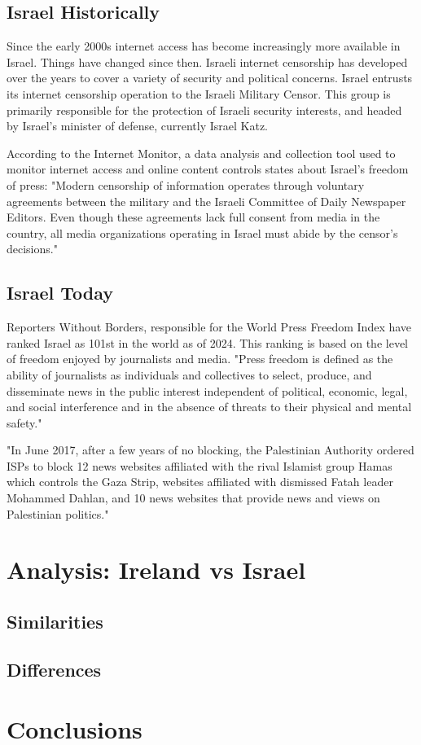 \subsection{Israel Historically}
Since the early 2000s internet access has become increasingly more available in Israel. Things have changed since then. Israeli internet censorship has developed over the years to cover a variety of security and political concerns. Israel entrusts its internet censorship operation to the Israeli Military Censor. This group is primarily responsible for the protection of Israeli security interests, and headed by Israel's minister of defense, currently Israel Katz. 

According to the Internet Monitor, a data analysis and collection tool used to monitor internet access and online content controls states about Israel's freedom of press: "Modern censorship of information operates through voluntary agreements between the military and the Israeli Committee of Daily Newspaper Editors. Even though these agreements lack full consent from media in the country, all media organizations operating in Israel must abide by the censor's decisions." \cite{internet_monitor_israel}



\subsection{Israel Today}
Reporters Without Borders, responsible for the World Press Freedom Index have ranked Israel as 101st in the world as of 2024. This ranking is based on the level of freedom enjoyed by journalists and media. "Press freedom is defined as the ability of journalists as individuals and collectives to select, produce, and disseminate news in the public interest independent of political, economic, legal, and social interference and in the absence of threats to their physical and mental safety." \cite{rsf_israel}

"In June 2017, after a few years of no blocking, the Palestinian Authority ordered ISPs
to block 12 news websites affiliated with the rival Islamist group Hamas which controls the Gaza Strip, websites affiliated with dismissed Fatah leader Mohammed Dahlan, and 10 news websites that provide news and views on Palestinian politics."\cite{zittrain2017shifting}


\section{Analysis: Ireland vs Israel}


\subsection{Similarities}



\subsection{Differences}



\section{Conclusions}

